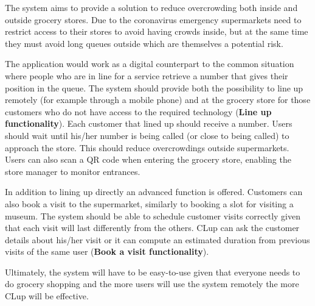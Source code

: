 The system aims to provide a solution to reduce overcrowding both inside and outside grocery stores.
Due to the coronavirus emergency supermarkets need to restrict access to their stores to avoid having crowds inside, but at the same time they must avoid long queues outside which are themselves a potential risk. \newline

The application would work as a digital counterpart to the common situation where people who are in line for a service retrieve a number that gives their position in the queue.
The system should provide both the possibility to line up remotely (for example through a mobile phone) and at the grocery store for those customers who do not have access to the required technology (\textbf{Line up functionality}).
Each customer that lined up should receive a number. Users should wait until his/her number is being called (or close to being called) to approach the store. This should reduce overcrowdings outside supermarkets.
Users can also scan a QR code when entering the grocery store, enabling the store manager to monitor entrances. \newline

In addition to lining up directly an advanced function is offered. Customers can also book a visit to the supermarket, similarly to booking a slot for visiting a museum. The system should be able to schedule customer visits correctly given that each visit will last differently from the others.  
CLup can ask the customer details about his/her visit or it can compute an estimated duration from previous visits of the same user (\textbf{Book a visit functionality}). \newline

Ultimately, the system will have to be easy-to-use given that everyone needs to do grocery shopping and the more users will use the system remotely the more CLup will be effective.

